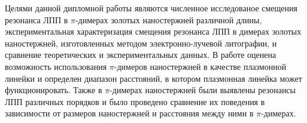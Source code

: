 Целями данной дипломной работы являются численное исследованое смещения резонанса ЛПП в $ \pi $-димерах золотых наностержней различной длины, экспериментальная характеризация смещения резонанса ЛПП в димерах золотых наностержней, изготовленных методом электронно-лучевой литографии, и сравнение теоретических и экспериментальных данных. В работе оценена возможность использования $ \pi $-димеров наностержней в качестве плазмонной линейки и определен диапазон расстояний, в котором плазмонная линейка может функционировать. Также в $ \pi $-димерах наностержней были выявлены резонансы ЛПП различных порядков и было проведено сравнение их поведения в зависимости от размеров наностержней и расстояния между ними в $ \pi $-димерах.